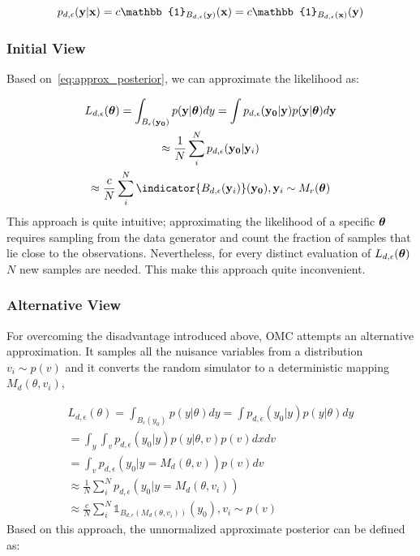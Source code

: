 \begin{equation}
  p_{d,\epsilon}(\yb|\xb) = c \mathbb{1}_{B_{d,\epsilon}(\yb)}(\xb) = c \mathbb{1}_{B_{d,\epsilon}(\xb)}(\yb)
\end{equation}

\subsubsection*{Initial View}

Based on~\ref{eq:approx_posterior}, we can approximate the likelihood as:

\begin{gather} \label{eq:primal_view}
  L_{d, \epsilon}(\thetab)=\int_{B_\epsilon(\data)}p(\yb|\thetab)dy = \int p_{d,\epsilon}(\data|\yb)p(\yb|\thetab)d\yb\\
  \approx \frac{1}{N} \sum_i^N p_{d,\epsilon} (\data|\yb_i) \\
  \approx \frac{c}{N} \sum_i^N \indicator{\region(\yb_i)}(\data), \yb_i \sim M_r(\thetab)
\end{gather}
%
This approach is quite intuitive; approximating the likelihood of a
specific $\boldsymbol{\theta}$ requires sampling from the data generator and count
the fraction of samples that lie close to the observations.
Nevertheless, for every distinct evaluation of
$L_{d,\epsilon}(\boldsymbol{\theta})$ $N$ new samples are needed. This make this
approach quite inconvenient.

\subsubsection*{Alternative View}

For overcoming the disadvantage introduced above, OMC attempts an
alternative approximation. It samples all the nuisance variables from
a distribution $v_i \sim p(v)$ and it converts the random simulator to
a deterministic mapping $M_d(\theta, v_i)$,

\begin{gather} 
  L_{d,\epsilon}(\theta)=\int_{B_\epsilon(y_0)}p(y|\theta)dy = \int p_{d,\epsilon}(y_0|y)p(y|\theta)dy\\
  = \int_y \int_v p_{d,\epsilon}(y_0|y)p(y|\theta, v) p(v)dxdv \\
  = \int_v p_{d,\epsilon}(y_0|y=M_d(\theta, v)) p(v)dv \\
  \approx \frac{1}{N} \sum_i^N p_{d,\epsilon} (y_0|y=M_d(\theta, v_i)) \\
  \approx \frac{c}{N} \sum_i^N \mathbb{1}_{B_{d,\epsilon}(M_d(\theta,
    v_i))} (y_0), v_i \sim p(v)
  \label{eq:alt_view}
\end{gather}
%
Based on this approach, the unnormalized approximate posterior can be
defined as:

